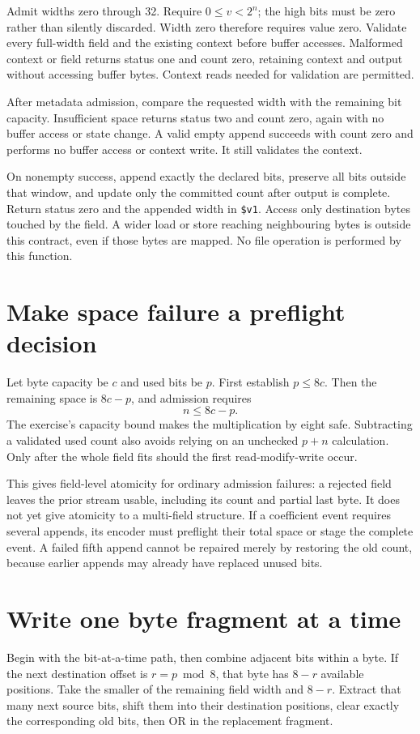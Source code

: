 Admit widths zero through 32. Require $0\leq v<2^n$; the high bits must be zero
rather than silently discarded. Width zero therefore requires value zero.
Validate every full-width field and the existing context before buffer accesses.
Malformed context or field returns status one and count zero, retaining context
and output without accessing buffer bytes. Context reads needed for validation
are permitted.

After metadata admission, compare the requested width with the remaining bit
capacity. Insufficient space returns status two and count zero, again with no
buffer access or state change. A valid empty append succeeds with count zero
and performs no buffer access or context write. It still validates the context.

On nonempty success, append exactly the declared bits, preserve all bits outside
that window, and update only the committed count after output is complete.
Return status zero and the appended width in \texttt{\$v1}. Access only destination
bytes touched by the field. A wider load or store reaching neighbouring bytes
is outside this contract, even if those bytes are mapped. No file operation is
performed by this function.

\section{Make space failure a preflight decision}
Let byte capacity be $c$ and used bits be $p$. First establish $p\leq8c$.
Then the remaining space is $8c-p$, and admission requires
\[
  n\leq8c-p.
\]
The exercise's capacity bound makes the multiplication by eight safe. Subtracting
a validated used count also avoids relying on an unchecked $p+n$ calculation.
Only after the whole field fits should the first read-modify-write occur.

This gives field-level atomicity for ordinary admission failures: a rejected
field leaves the prior stream usable, including its count and partial last byte.
It does not yet give atomicity to a multi-field structure. If a coefficient event
requires several appends, its encoder must preflight their total space or stage
the complete event. A failed fifth append cannot be repaired merely by restoring
the old count, because earlier appends may already have replaced unused bits.

\section{Write one byte fragment at a time}
Begin with the bit-at-a-time path, then combine adjacent bits within a byte.
If the next destination offset is $r=p\bmod8$, that byte has $8-r$ available
positions. Take the smaller of the remaining field width and $8-r$. Extract
that many next source bits, shift them into their destination positions, clear
exactly the corresponding old bits, then OR in the replacement fragment.

